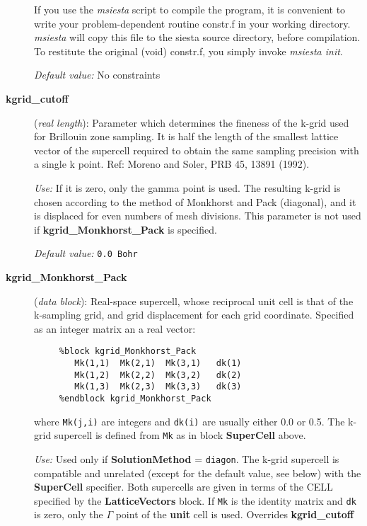 \begin{description}
If you use the {\it msiesta} script to compile the program, it is
convenient to write your problem-dependent routine constr.f in your
working directory. {\it msiesta} will copy this file to the
siesta source directory, before compilation. To restitute the 
original (void) constr.f, you simply invoke {\it msiesta init}.

{\it Default value:} No constraints


\item[{\bf kgrid\_cutoff}] ({\it real length}): 
Parameter which determines
the fineness of the k-grid used for Brillouin zone sampling.
It is half the length of the smallest lattice vector of the supercell 
required to obtain the same sampling precision with a single k point.
Ref: Moreno and Soler, PRB 45, 13891 (1992).

{\it Use:} If it is zero, only the gamma point is used.
The resulting k-grid is chosen according to the method of
Monkhorst and Pack (diagonal), and it is displaced for even numbers 
of mesh divisions.
This parameter is not used if {\bf kgrid\_Monkhorst\_Pack} is specified.

{\it Default value:} {\tt 0.0 Bohr}
        

\item[{\bf kgrid\_Monkhorst\_Pack}] ({\it data block}): 
Real-space supercell, whose reciprocal unit cell is that of the
k-sampling grid, and grid displacement for each grid coordinate.
Specified as an integer matrix an a real vector:

\begin{verbatim}
     %block kgrid_Monkhorst_Pack
        Mk(1,1)  Mk(2,1)  Mk(3,1)   dk(1) 
        Mk(1,2)  Mk(2,2)  Mk(3,2)   dk(2) 
        Mk(1,3)  Mk(2,3)  Mk(3,3)   dk(3) 
     %endblock kgrid_Monkhorst_Pack 
\end{verbatim}

where {\tt Mk(j,i)} are integers and {\tt dk(i)} are usually
either 0.0 or 0.5. The k-grid supercell is defined from {\tt Mk}
as in block {\bf SuperCell} above.

{\it Use:} Used only if {\bf SolutionMethod} = {\tt diagon}.
The k-grid supercell is compatible and unrelated 
(except for the default value, see below)
with the {\bf SuperCell} specifier. Both supercells are given in 
terms of the CELL specified by the {\bf LatticeVectors} block.
If {\tt Mk} is the identity matrix and {\tt dk} 
is zero, only the $\Gamma$ point of the {\bf unit} cell is used. 
Overrides {\bf kgrid\_cutoff}


\end{description}
